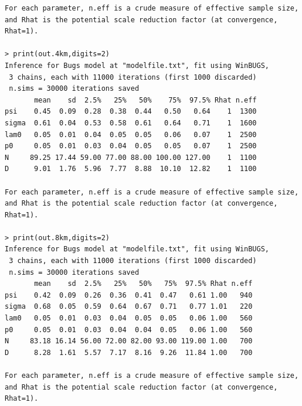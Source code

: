 {{{\begin{verbatim}
For each parameter, n.eff is a crude measure of effective sample size,
and Rhat is the potential scale reduction factor (at convergence, Rhat=1).

> print(out.4km,digits=2)
Inference for Bugs model at "modelfile.txt", fit using WinBUGS,
 3 chains, each with 11000 iterations (first 1000 discarded)
 n.sims = 30000 iterations saved
       mean    sd  2.5%   25%   50%    75%  97.5% Rhat n.eff
psi    0.45  0.09  0.28  0.38  0.44   0.50   0.64    1  1300
sigma  0.61  0.04  0.53  0.58  0.61   0.64   0.71    1  1600
lam0   0.05  0.01  0.04  0.05  0.05   0.06   0.07    1  2500
p0     0.05  0.01  0.03  0.04  0.05   0.05   0.07    1  2500
N     89.25 17.44 59.00 77.00 88.00 100.00 127.00    1  1100
D      9.01  1.76  5.96  7.77  8.88  10.10  12.82    1  1100

For each parameter, n.eff is a crude measure of effective sample size,
and Rhat is the potential scale reduction factor (at convergence, Rhat=1).

> print(out.8km,digits=2)
Inference for Bugs model at "modelfile.txt", fit using WinBUGS,
 3 chains, each with 11000 iterations (first 1000 discarded)
 n.sims = 30000 iterations saved
       mean    sd  2.5%   25%   50%   75%  97.5% Rhat n.eff
psi    0.42  0.09  0.26  0.36  0.41  0.47   0.61 1.00   940
sigma  0.68  0.05  0.59  0.64  0.67  0.71   0.77 1.01   220
lam0   0.05  0.01  0.03  0.04  0.05  0.05   0.06 1.00   560
p0     0.05  0.01  0.03  0.04  0.04  0.05   0.06 1.00   560
N     83.18 16.14 56.00 72.00 82.00 93.00 119.00 1.00   700
D      8.28  1.61  5.57  7.17  8.16  9.26  11.84 1.00   700

For each parameter, n.eff is a crude measure of effective sample size,
and Rhat is the potential scale reduction factor (at convergence, Rhat=1).
\end{verbatim}
}


}}
